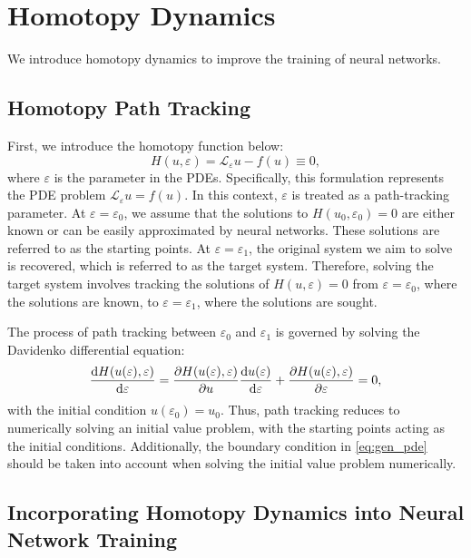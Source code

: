 \section{Homotopy Dynamics}
\label{sec: Method}
We introduce homotopy dynamics to improve the training of neural networks.

\subsection{Homotopy Path Tracking}

First, we introduce the homotopy function below:
\begin{equation}
    H(u,\varepsilon) = \mathcal{L}_\varepsilon u - f(u) \equiv 0,
\end{equation}
where $\varepsilon$ is the parameter in the PDEs. Specifically, this formulation represents the PDE problem $\mathcal{L}_\varepsilon u = f(u)$.  In this context, $\varepsilon$ is treated as a path-tracking parameter. At $\varepsilon = \varepsilon_0$, we assume that the solutions to \( H(u_0, \varepsilon_0) = 0 \) are either known or can be easily approximated by neural networks. These solutions are referred to as the starting points. At $\varepsilon = \varepsilon_1$, the original system we aim to solve is recovered, which is referred to as the target system. Therefore, solving the target system involves tracking the solutions of \( H(u, \varepsilon) = 0 \) from \( \varepsilon = \varepsilon_0 \), where the solutions are known, to \( \varepsilon = \varepsilon_1 \), where the solutions are sought.

The process of path tracking between $\varepsilon_0$ and $\varepsilon_1$ is governed by solving the Davidenko differential equation:
\begin{equation}
\frac{\mathrm{d} H(u(\varepsilon), \varepsilon)}{\mathrm{d} \varepsilon}=\frac{\partial H(u(\varepsilon),\varepsilon)}{\partial u} \frac{\mathrm{d} u(\varepsilon)}{\mathrm{d} \varepsilon}+\frac{\partial H(u(\varepsilon), \varepsilon)}{\partial \varepsilon}= 0,
\label{eq:homotopy_dynamics}
\end{equation}
with the initial condition $u(\varepsilon_0)=u_0$.
Thus, path tracking reduces to numerically solving an initial value problem, with the starting points acting as the initial conditions. Additionally, the boundary condition in \eqref{eq:gen_pde} should be taken into account when solving the initial value problem numerically.



\subsection{Incorporating Homotopy Dynamics into Neural Network Training}

